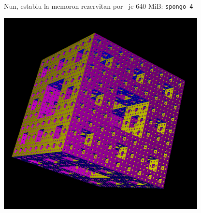 Nun, establu la memoron rezervitan por \xlogo\ je 640 MiB: \texttt{spongo 4}
\begin{center}
 \includegraphics{bildoj/menger-menger4.png}
\end{center}
